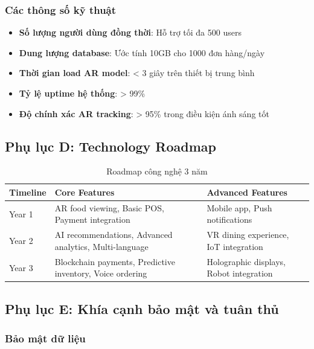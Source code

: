 \documentclass[12pt,a4paper]{article}
\begin{document}
\subsubsection{Các thông số kỹ thuật}

\begin{itemize}[leftmargin=1cm]
    \item \textbf{Số lượng người dùng đồng thời}: Hỗ trợ tối đa 500 users
    \item \textbf{Dung lượng database}: Ước tính 10GB cho 1000 đơn hàng/ngày
    \item \textbf{Thời gian load AR model}: < 3 giây trên thiết bị trung bình
    \item \textbf{Tỷ lệ uptime hệ thống}: > 99\%
    \item \textbf{Độ chính xác AR tracking}: > 95\% trong điều kiện ánh sáng tốt
\end{itemize}

\subsection{Phụ lục D: Technology Roadmap}

\begin{table}[H]
\centering
\caption{Roadmap công nghệ 3 năm}
\label{tab:tech-roadmap}
\begin{tabular}{@{}>{\raggedright\arraybackslash}p{2cm}>{\raggedright\arraybackslash}p{5cm}>{\raggedright\arraybackslash}p{5cm}@{}}
\toprule
\textbf{Timeline} & \textbf{Core Features} & \textbf{Advanced Features} \\
\midrule
Year 1 & AR food viewing, Basic POS, Payment integration & Mobile app, Push notifications \\
Year 2 & AI recommendations, Advanced analytics, Multi-language & VR dining experience, IoT integration \\
Year 3 & Blockchain payments, Predictive inventory, Voice ordering & Holographic displays, Robot integration \\
\bottomrule
\end{tabular}
\end{table}

\subsection{Phụ lục E: Khía cạnh bảo mật và tuân thủ}

\subsubsection{Bảo mật dữ liệu}
\end{document}
